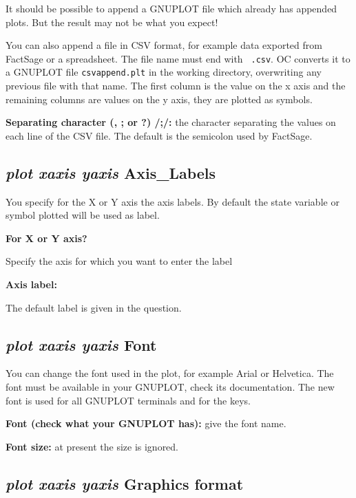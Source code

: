 \documentclass[11pt]{article}
\begin{document}
It should be possible to append a GNUPLOT file which already has
appended plots.  But the result may not be what you expect!

\hypertarget{CSV separator}{}
You can also append a file in CSV format, for example data exported
from FactSage or a spreadsheet.  The file name must end with {\tt
  .csv}.  OC converts it to a GNUPLOT file {\tt csvappend.plt} in the
working directory, overwriting any previous file with that name.
The first column is the value on the x axis and the remaining
columns are values on the y axis, they are plotted as symbols.

{\bf Separating character (, ; or ?) /;/:} the character separating
the values on each line of the CSV file.  The default is the
semicolon used by FactSage.

\hypertarget{Plot axis labels}{}
\subsection{{\em plot xaxis yaxis} Axis\_Labels}

You specify for the X or Y axis the axis labels.  By default the state
variable or symbol plotted will be used as label.

{\bf For X or Y axis?}

Specify the axis for which you want to enter the label

{\bf Axis label:}

The default label is given in the question.

\hypertarget{Plot fonts}{}
\hypertarget{Plot font}{}
\subsection{{\em plot xaxis yaxis} Font}

You can change the font used in the plot, for example Arial or
Helvetica.  The font must be available in your GNUPLOT, check its
documentation.  The new font is used for all GNUPLOT terminals and
for the keys.

{\bf Font (check what your GNUPLOT has):} give the font name.

{\bf Font size:} at present the size is ignored.

\hypertarget{Plot formats}{}
\subsection{{\em plot xaxis yaxis} Graphics format}
\end{document}
